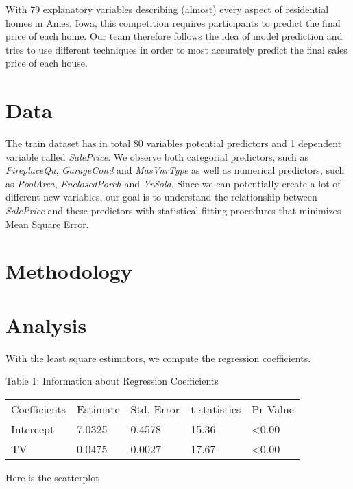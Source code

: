 \documentclass[a4paper]{article}
\begin{document}
With 79 explanatory variables describing (almost) every aspect of residential homes in Ames, Iowa, this competition requires participants to predict the final price of each home. Our team therefore follows the idea of model prediction and tries to use different techniques in order to most accurately predict the final sales price of each house. \newline


\section{Data}



The train dataset has in total 80 variables  potential predictors and 1 dependent variable called \textit{SalePrice}. We observe both categorial predictors, such as \textit{FireplaceQu}, \textit{GarageCond} and \textit{MasVnrType} as well as numerical predictors, such as \textit{PoolArea}, \textit{EnclosedPorch} and \textit{YrSold}. Since we can potentially create a lot of different new variables, our goal is to understand the relationship between \textit{SalePrice} and these predictors with statistical fitting procedures that minimizes Mean Square Error.

\section{Methodology}



\section{Analysis}

With the least square estimators, we compute the regression coefficients.

Table 1: Information about Regression Coefficients

\vspace{2mm}
\begin{tabular}{ | p{3cm} | p{2cm} | p{2cm} | p{2cm} | p{2cm} |}
  \hline			
  Coefficients & Estimate & Std. Error & t-statistics & Pr Value \\
  Intercept & 7.0325 & 0.4578 & 15.36 & <0.00 \\
  TV & 0.0475 & 0.0027 & 17.67 & <0.00 \\
  \hline  
\end{tabular}

\vspace{5mm}
Here is the scatterplot
\end{document}
